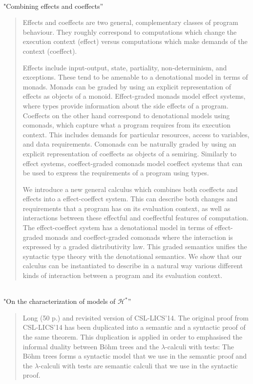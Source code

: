 \documentclass{article}[11pt]
\begin{document}
\begin{itemize}[itemindent=0em,leftmargin=6em, labelsep=1em]
\\"Combining effects and coeffects''\vspace{-0.5em}
\begin{quote}
  Effects and coeffects are two general, complementary classes of
  program behaviour. They roughly correspond to computations
  which change the execution context (effect) versus computations
  which make demands of the context (coeffect).

  Effects include input-output, state, partiality, non-determinism,
  and exceptions. These tend to be amenable to a denotational model
  in terms of monads. Monads can be graded by using an explicit
  representation of effects as objects of a monoid. Effect-graded monads
  model effect systems, where types provide information about the
  side effects of a program. Coeffects on the other hand correspond
  to denotational models using comonads, which capture what a program 
  requires from its execution context. This includes demands
  for particular resources, access to variables, and data requirements.
  Comonads can be naturally graded by using an explicit representation of coeffects as objects of a semiring. Similarly to effect systems,
  coeffect-graded comonads model coeffect systems that can be
  used to express the requirements of a program using types.

  We introduce a new general calculus which combines both coeffects
  and effects into a effect-coeffect system. This can describe
  both changes and requirements that a program has on its evaluation
  context, as well as interactions between these effectful and coeffectful
  features of computation. The effect-coeffect system has a
  denotational model in terms of effect-graded monads and coeffect-graded
  comonads where the interaction is expressed by a graded
  distributivity law. This graded semantics unifies the syntactic type
  theory with the denotational semantics. We show that our calculus
  can be instantiated to describe in a natural way various different
  kinds of interaction between a program and its evaluation context.
\end{quote}
\\"On the characterization of models of $\mathcal{H}^*$''\vspace{-0.5em}
\begin{quote}
  Long (50 p.) and revisited version of CSL-LICS'14. The original proof from CSL-LICS'14 has been duplicated into a semantic and a syntactic proof of the same theorem. This duplication is applied in order to emphasised the informal duality between B\"ohm trees and the $\lambda$-calculi with tests: The B\"ohm trees forms a syntactic model that we use in the semantic proof and the $\lambda$-calculi with tests are semantic calculi that we use in the syntactic proof.
\end{quote}
\end{itemize}
\end{document}
